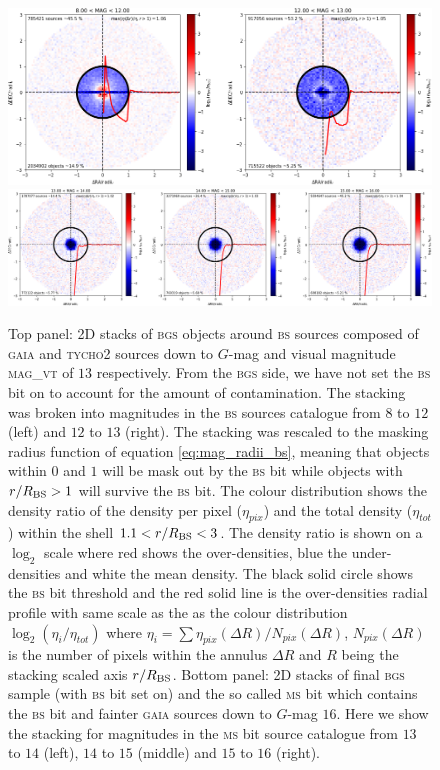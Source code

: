 \documentclass[fleqn,usenatbib]{mnras}
\newcommand{\BGS}{\textsc{bgs}\xspace}
\newcommand{\BS}{\textsc{bs}\xspace}
\newcommand{\GAIA}{\textsc{gaia}\xspace}
\newcommand{\MS}{\textsc{ms}\xspace}
\newcommand{\Tycho}{\textsc{tycho2}\xspace}
\begin{document}
\begin{figure}
	\includegraphics[width=16cm]{images/2dstack_reescaled_bs_south_nobsmask}
	\includegraphics[width=16cm]{images/2dstack_reescaled_ms_south_withbsmask.png}
    \caption{Top panel: 2D stacks of \BGS objects around \BS sources composed of \GAIA and \Tycho sources down to $G$-mag and visual magnitude \textsc{mag}\_\textsc{vt} of $13$ respectively. From the \BGS side, we have not set the \BS bit on to account for the amount of contamination. The stacking was broken into magnitudes in the \BS sources catalogue from $8$ to $12$ (left) and $12$ to $13$ (right). The stacking was rescaled to the masking radius function of equation \ref{eq:mag_radii_bs}, meaning that objects within $0$ and $1$ will be mask out by the \BS bit while objects with $r/R_{\rm BS} > 1$ will survive the \BS bit. The colour distribution shows the density ratio of the density per pixel ($\eta_{pix}$) and the total density ($\eta_{tot}$) within the shell $1.1 < r/R_{\rm BS} < 3$. The density ratio is shown on a $\log_2$ scale where red shows the over-densities, blue the under-densities and white the mean density. The black solid circle shows the \BS bit threshold and the red solid line is the over-densities radial profile with same scale as the as the colour distribution $\log_2(\eta_i/\eta_{tot})$ where $\eta_i = \sum \eta_{pix}(\Delta R)/N_{pix}(\Delta R)$, $N_{pix}(\Delta R)$ is the number of pixels within the annulus $\Delta R$ and $R$ being the stacking scaled axis $r/R_{\rm BS}$. Bottom panel: 2D stacks of final \BGS sample (with \BS bit set on) and the so called \MS bit which contains the \BS bit and fainter \GAIA sources down to $G$-mag $16$. Here we show the stacking for magnitudes in the \MS bit source catalogue from $13$ to $14$ (left), $14$ to $15$ (middle) and $15$ to $16$ (right).}
    \label{fig:2dstack_tycho_reescaled}
\end{figure}
\end{document}
